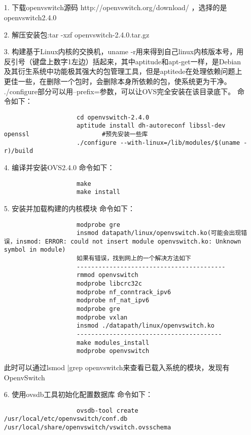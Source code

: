 \documentclass[a4paper,left=1.5cm,right=1.5cm,11pt]{article}
\begin{document}
\tableofcontents

\clearpage

\subsection{}
	\begin{itemize}
        \item[1.]下载openvswitch源码 http://openvswitch.org/download/ ，选择的是openvswitch2.4.0
		\item[2.]解压安装包:tar -xzf openvswitch-2.4.0.tar.gz
		\item[3.]构建基于Linux内核的交换机，uname -r用来得到自己linux内核版本号，用反引号（键盘上数字1左边）括起来，其中aptitude和apt-get一样，是Debian及其衍生系统中功能极其强大的包管理工具，但是aptitede在处理依赖问题上更佳一些，在删除一个包时，会删除本身所依赖的包，使系统更为干净。
                 ./configure部分可以用--prefix=参数，可以让OVS完全安装在该目录底下。
				 命令如下：
				 \begin{lstlisting}
					cd openvswitch-2.4.0
					aptitude install dh-autoreconf libssl-dev openssl                    #预先安装一些库
					./configure --with-linux=/lib/modules/$(uname -r)/build
				 \end{lstlisting}
		\item[4.]编译并安装OVS2.4.0
		         命令如下：
				 \begin{lstlisting}
					make
					make install
				 \end{lstlisting}
		\item[5.]安装并加载构建的内核模块
				 命令如下：
				 \begin{lstlisting}
					modprobe gre
					insmod datapath/linux/openvswitch.ko(可能会出现错误，insmod: ERROR: could not insert module openvswitch.ko: Unknown symbol in module)
					如果有错误，找到网上的一个解决方法如下
					-----------------------------------------
					rmmod openvswitch
					modprobe libcrc32c
					modprobe nf_conntrack_ipv6
					modprobe nf_nat_ipv6
					modprobe gre
					modprobe vxlan
					insmod ./datapath/linux/openvswitch.ko
					----------------------------------------
					make modules_install
					modprobe openvswitch
				 \end{lstlisting}
				 此时可以通过lsmod |grep openvswitch来查看已载入系统的模块，发现有OpenvSwitch
		\item[6.]使用ovsdb工具初始化配置数据库
				命令如下：
				 \begin{lstlisting}
					ovsdb-tool create /usr/local/etc/openvswitch/conf.db /usr/local/share/openvswitch/vswitch.ovsschema

\end{lstlisting}
\end{itemize}
\end{document}
